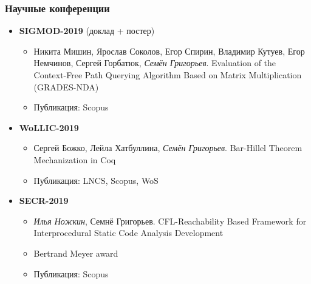 \documentclass[xcolor=table]{beamer}
\begin{document}
\begin{frame}[fragile]
  \transwipe[direction=90]
  \frametitle{Научные конференции}
\begin{itemize}

      \item \textbf{SIGMOD-2019} (доклад + постер)
      \begin{itemize}
        \item Никита Мишин, Ярослав Соколов, Егор Спирин, Владимир Кутуев, Егор Немчинов, Сергей Горбатюк, \emph{Семён Григорьев}. Evaluation of the Context-Free Path Querying Algorithm Based on Matrix Multiplication (GRADES-NDA)
        \item Публикация: Scopus
      \end{itemize}

      \item \textbf{WoLLIC-2019}
      \begin{itemize}
        \item Сергей Божко, Лейла Хатбуллина, \emph{Семён Григорьев}. Bar-Hillel Theorem Mechanization in Coq
        \item Публикация: LNCS, Scopus, WoS
      \end{itemize}

      \item \textbf{SECR-2019}
      \begin{itemize}
         \item \emph{Илья Ножкин}, Семнё Григорьев. CFL-Reachability Based Framework for Interprocedural Static Code Analysis Development
         \item Bertrand Meyer award
         \item Публикация: Scopus
      \end{itemize}

    \end{itemize}
    \end{frame}
\end{document}
